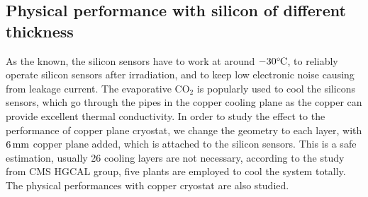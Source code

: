\subsection{Physical performance with silicon of different thickness} 
\label{sec:physical}

As the known,
the silicon sensors have to work at around $-30^{\circ}\hspace{-0.09em}\mathrm{C}$,
to reliably operate silicon sensors after irradiation,
and to keep low electronic noise causing from leakage current.
The evaporative $\mathrm{CO}_{2}$ is popularly used to cool the silicons sensors,
which go through the pipes in the copper cooling plane
as the copper can provide excellent thermal conductivity.
In order to study the effect to the performance of copper plane cryostat,
we change the geometry to each layer,
with $6\text{\,mm}$ copper plane added,
which is attached to the silicon sensors.
This is a safe estimation,
usually 26 cooling layers are not necessary,
according to the study from CMS HGCAL group,
five plants are employed to cool the system totally.
The physical performances with copper cryostat are also studied.  


